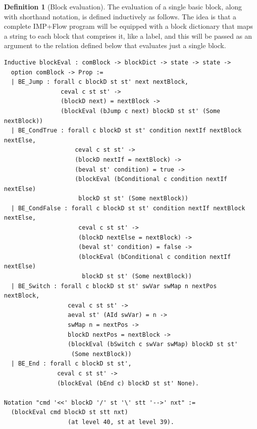 \documentclass[12pt,notitlepage]{report}
\theoremstyle{plain}
\theoremstyle{definition}
\newtheorem{defin}[theo]{Definition}
\numberwithin{equation}{section}
\begin{document}
\begin{defin}[Block evaluation]
The evaluation of a single basic block, along with shorthand notation, is defined inductively as follows.  The idea is that a complete IMP+Flow program will be equipped with a block dictionary that maps a string to each block that comprises it, like a label, and this will be passed as an argument to the relation defined below that evaluates just a single block.
\begin{verbatim}
Inductive blockEval : comBlock -> blockDict -> state -> state -> 
  option comBlock -> Prop :=
  | BE_Jump : forall c blockD st st' next nextBlock,
                ceval c st st' ->
                (blockD next) = nextBlock ->
                (blockEval (bJump c next) blockD st st' (Some nextBlock))
  | BE_CondTrue : forall c blockD st st' condition nextIf nextBlock nextElse,
                    ceval c st st' ->
                    (blockD nextIf = nextBlock) ->
                    (beval st' condition) = true ->
                    (blockEval (bConditional c condition nextIf nextElse) 
                     blockD st st' (Some nextBlock))
  | BE_CondFalse : forall c blockD st st' condition nextIf nextBlock nextElse,
                     ceval c st st' ->
                     (blockD nextElse = nextBlock) ->
                     (beval st' condition) = false ->
                     (blockEval (bConditional c condition nextIf nextElse) 
                      blockD st st' (Some nextBlock))
  | BE_Switch : forall c blockD st st' swVar swMap n nextPos nextBlock,
                  ceval c st st' ->
                  aeval st' (AId swVar) = n ->
                  swMap n = nextPos ->
                  blockD nextPos = nextBlock ->
                  (blockEval (bSwitch c swVar swMap) blockD st st' 
                   (Some nextBlock))
  | BE_End : forall c blockD st st',
               ceval c st st' ->
               (blockEval (bEnd c) blockD st st' None).

Notation "cmd '<<' blockD '/' st '\' stt '-->' nxt" :=
  (blockEval cmd blockD st stt nxt)
                  (at level 40, st at level 39).
\end{verbatim}
\end{defin}
\end{document}

